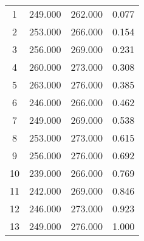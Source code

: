 % 
\begin{tabular}{cccc}
  \hline
  \hline
1 & 249.000 & 262.000 & 0.077 \\ 
  2 & 253.000 & 266.000 & 0.154 \\ 
  3 & 256.000 & 269.000 & 0.231 \\ 
  4 & 260.000 & 273.000 & 0.308 \\ 
  5 & 263.000 & 276.000 & 0.385 \\ 
  6 & 246.000 & 266.000 & 0.462 \\ 
  7 & 249.000 & 269.000 & 0.538 \\ 
  8 & 253.000 & 273.000 & 0.615 \\ 
  9 & 256.000 & 276.000 & 0.692 \\ 
  10 & 239.000 & 266.000 & 0.769 \\ 
  11 & 242.000 & 269.000 & 0.846 \\ 
  12 & 246.000 & 273.000 & 0.923 \\ 
  13 & 249.000 & 276.000 & 1.000 \\ 
   \hline
\end{tabular}
